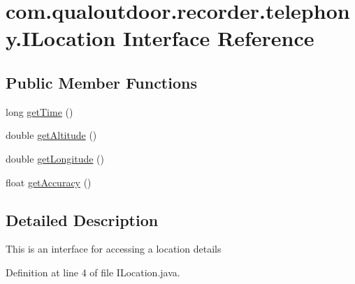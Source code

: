 \hypertarget{interfacecom_1_1qualoutdoor_1_1recorder_1_1telephony_1_1ILocation}{\section{com.\-qualoutdoor.\-recorder.\-telephony.\-I\-Location Interface Reference}
\label{interfacecom_1_1qualoutdoor_1_1recorder_1_1telephony_1_1ILocation}
}
\subsection*{Public Member Functions}
\begin{DoxyCompactItemize}
\item 
long \hyperlink{interfacecom_1_1qualoutdoor_1_1recorder_1_1telephony_1_1ILocation_ab5830a326501790c9a62299aa87a8647}{get\-Time} ()
\item 
double \hyperlink{interfacecom_1_1qualoutdoor_1_1recorder_1_1telephony_1_1ILocation_a931dbc3d8450e9eb5b2dbca4353f2f33}{get\-Altitude} ()
\item 
double \hyperlink{interfacecom_1_1qualoutdoor_1_1recorder_1_1telephony_1_1ILocation_aa96b362e0fae13e0ee765d2ec68f11c5}{get\-Longitude} ()
\item 
float \hyperlink{interfacecom_1_1qualoutdoor_1_1recorder_1_1telephony_1_1ILocation_a9f7cc64e71a367c097b4bf247525c670}{get\-Accuracy} ()
\end{DoxyCompactItemize}


\subsection{Detailed Description}
This is an interface for accessing a location details 

Definition at line 4 of file I\-Location.\-java.



